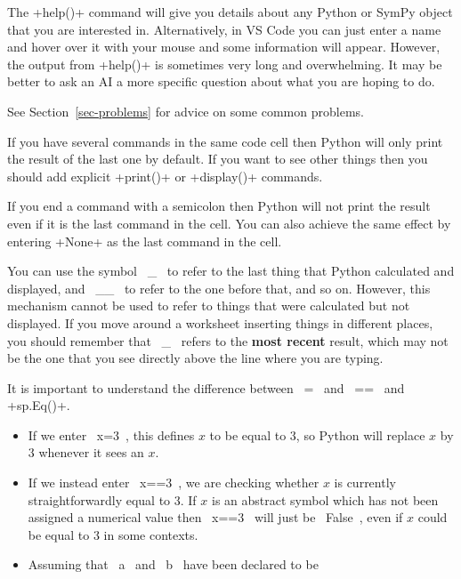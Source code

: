 \documentclass[a4paper,10pt]{amsbook}
\begin{document}
\begin{secenum}
\item\label{help} The \pcode+help()+ command will give you details about any
 Python or SymPy object that you are interested in.  Alternatively, in
 VS Code you can just enter a name and hover over it with your mouse
 and some information will appear.  However, the output from \pcode+help()+
 is sometimes very long and overwhelming.  It may be better to ask an
 AI a more specific question about what you are hoping to do.
%
 \item\label{problems} See Section~\ref{sec-problems}
 for advice on some common problems. 
%
 \item\label{lastoutput} If you have several commands in the same code cell
 then Python will only print the result of the last one by default.
 If you want to see other things then you should add explicit
 \pcode+print()+ or \pcode+display()+ commands.
%
 \item\label{semicolon}
 If you end a command with a semicolon then Python will not 
 print the result even if it is the last command in the cell.
 You can also achieve the same effect by entering \pcode+None+
 as the last command in the cell.
%
 \item\label{underscore} You can use the symbol \pcode~_~
 to refer to the last thing that Python calculated and displayed,
 and \pcode~__~ to refer to the one before that, and so on. 
 However, this mechanism cannot be used to refer to things that were
 calculated but not displayed.
 If you move around a worksheet inserting things in
 different places, you should remember that \pcode~_~ refers
 to the \textbf{most recent} result, which may not be the
 one that you see directly above the line where you are
 typing.  
%
 \item\label{equals}
 It is important to understand the difference between
 \pcode~=~ and \pcode~==~ and \pcode+sp.Eq()+.  
 \begin{itemize}
  \item If we enter \pcode~x=3~, this defines $x$ to be equal to $3$, so
   Python will replace $x$ by $3$ whenever it sees an $x$.
  \item If we instead enter \pcode~x==3~, we are checking whether $x$ is
   currently straightforwardly equal to $3$.  If $x$ is an abstract
   symbol which has not been assigned a numerical value then \pcode~x==3~
   will just be \pcode~False~, even if $x$ could be equal to $3$ in some
   contexts.  
  \item Assuming that \pcode~a~ and \pcode~b~ have been declared to be

\end{itemize}
\end{secenum}
\end{document}
